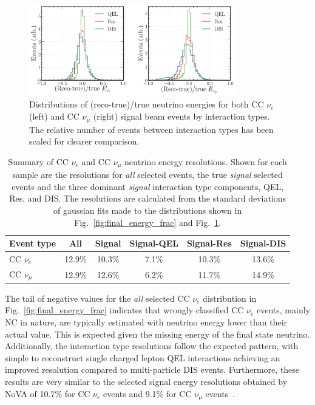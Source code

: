 \begin{figure} %
    \includegraphics[width=0.8\textwidth]{diagrams/6-cvn/chipsnet/final_energy_frac_split.pdf}
    \caption[Distributions of (reco-true)/true neutrino energies by interaction type.]
    {Distributions of (reco-true)/true neutrino energies for both CC $\nu_{e}$ (left) and CC
        $\nu_{\mu}$ (right) signal beam events by interaction types. The relative number of events
        between interaction types has been scaled for clearer comparison.}
    \label{fig:final_energy_frac_split}
\end{figure}

\begin{table}
    \begin{tabular}{lccccc}
        Event type     & All    & Signal & Signal-QEL & Signal-Res & Signal-DIS \\
        \midrule
        CC $\nu_{e}$   & 12.9\% & 10.3\% & 7.1\%      & 10.3\%     & 13.6\%     \\
        CC $\nu_{\mu}$ & 12.9\% & 12.6\% & 6.2\%      & 11.7\%     & 14.9\%     \\
    \end{tabular}
    \caption[Summary of CC $\nu_{e}$ and CC $\nu_{\mu}$ neutrino energy resolutions]
    {Summary of CC $\nu_{e}$ and CC $\nu_{\mu}$ neutrino energy resolutions. Shown for each sample
        are the resolutions for \emph{all} selected events, the true \emph{signal} selected events
        and the three dominant \emph{signal} interaction type components, QEL, Res, and DIS. The
        resolutions are calculated from the standard deviations of gaussian fits made to the
        distributions shown in Fig.~\ref{fig:final_energy_frac} and
        Fig.~\ref{fig:final_energy_frac_split}.}
    \label{tab:energy_resolutions}
\end{table}

The tail of negative values for the \emph{all} selected CC $\nu_{e}$ distribution in
Fig.~\ref{fig:final_energy_frac} indicates that wrongly classified CC $\nu_{e}$ events, mainly NC
in nature, are typically estimated with neutrino energy lower than their actual value. This is
expected given the missing energy of the final state neutrino. Additionally, the interaction type
resolutions follow the expected pattern, with simple to reconstruct single charged lepton QEL
interactions achieving an improved resolution compared to multi-particle DIS events. Furthermore,
these results are very similar to the selected signal energy resolutions obtained by NoVA of
10.7\% for CC $\nu_{e}$ events and 9.1\% for CC $\nu_{\mu}$ events~\cite{acero2019}.

